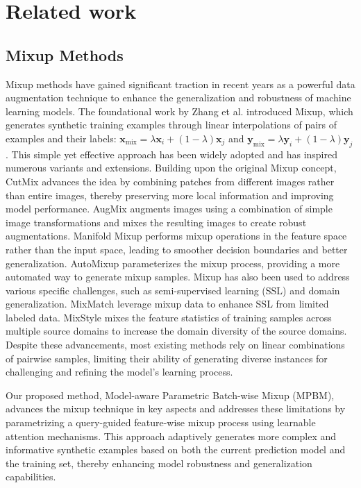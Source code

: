 \section{Related work}
\subsection{Mixup Methods}
Mixup methods have gained significant traction in recent years as a powerful data augmentation technique to enhance the generalization and robustness of machine learning models. The foundational work by Zhang et al. \cite{zhang2018mixup} introduced Mixup, which generates synthetic training examples through linear interpolations of pairs of examples and their labels: 
$\mathbf{x}_{\text{mix}}=\lambda \mathbf{x}_i + (1-\lambda)\mathbf{x}_j$ 
and $\mathbf{y}_{\text{mix}}=\lambda \mathbf{y}_i + (1-\lambda)\mathbf{y}_j$. 
This simple yet effective approach has been widely adopted and has inspired numerous variants and extensions.
Building upon the original Mixup concept, CutMix \cite{yun2019cutmix} advances the idea by combining patches from different images rather than entire images, thereby preserving more local information and improving model performance. 
AugMix \cite{hendrycks2019augmix} augments images using a combination of simple image transformations and mixes the resulting images to create robust augmentations. 
Manifold Mixup \cite{verma2019manifold} performs mixup operations in the feature space rather than the input space, leading to smoother decision boundaries and better generalization.
AutoMixup \cite{liu2022automix} parameterizes the mixup process, 
providing a more automated way to generate mixup samples. 
Mixup has also been used to address various specific challenges, 
such as semi-supervised learning (SSL) and domain generalization. 
MixMatch \cite{berthelot2019mixmatch} leverage mixup data 
to enhance SSL from limited labeled data. 
MixStyle \cite{zhou2020domain} mixes the feature statistics of training samples across multiple source domains 
to increase the domain diversity of the source domains. 
Despite these advancements, most existing methods rely on linear combinations of pairwise samples, 
limiting their ability of 
generating diverse instances
for challenging and refining the model's learning process.

Our proposed method, Model-aware Parametric Batch-wise Mixup (MPBM), 
advances the mixup technique in key aspects and 
addresses these limitations by 
parametrizing a query-guided feature-wise mixup process 
using learnable attention mechanisms. 
This approach adaptively generates more complex and informative synthetic examples
based on both the current prediction model and the training set, 
thereby enhancing model robustness and generalization capabilities.

